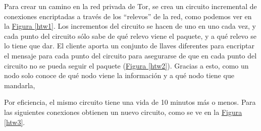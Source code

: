 \documentclass[10pt,a4paper,spanish]{article}
\begin{document}
Para crear un camino en la red privada de Tor, se crea un circuito incremental de conexiones encriptadas a través de los ``relevos'' de la red, como podemos ver en la \hyperref[htw1]{Figura \ref*{htw1}}. Los incrementos del circuito se hacen de uno en uno cada vez, y cada punto del circuito sólo sabe de qué relevo viene el paquete, y a qué relevo se lo tiene que dar. El cliente aporta un conjunto de llaves diferentes para encriptar el mensaje para cada punto del circuito para asegurarse de que en cada punto del circuito no se pueda seguir el paquete (\hyperref[htw2]{Figura \ref*{htw2}}). Gracias a esto, como un nodo solo conoce de qué nodo viene la información y a qué nodo tiene que mandarla, 

Por eficiencia, el mismo circuito tiene una vida de 10 minutos más o menos. Para las siguientes conexiones obtienen un nuevo circuito, como se ve en la \hyperref[htw3]{Figura \ref*{htw3}}.
\end{document}
